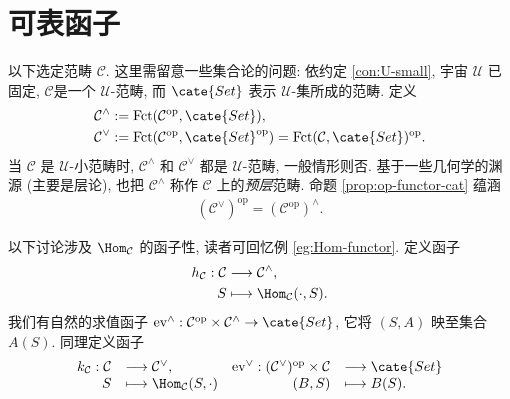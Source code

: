 \section{可表函子}\label{sec:representable-functors}
以下选定范畴 $\mathcal{C}$. 这里需留意一些集合论的问题: 依约定 \ref{con:U-small}, 宇宙 $\mathcal{U}$ 已固定, $\mathcal{C} $是一个 $\mathcal{U}$-范畴, 而 $\cate{Set}$ 表示 $\mathcal{U}$-集所成的范畴. 定义
\begin{align*}
	\mathcal{C}^\wedge & := \text{Fct}(\mathcal{C}^\text{op}, \cate{Set}), \\
	\mathcal{C}^\vee & := \text{Fct}(\mathcal{C}^\text{op}, \cate{Set}^\text{op}) = \text{Fct}(\mathcal{C}, \cate{Set})^\text{op}.
\end{align*}
当 $\mathcal{C}$ 是 $\mathcal{U}$-小范畴时, $\mathcal{C}^\wedge$ 和 $\mathcal{C}^\vee$ 都是 $\mathcal{U}$-范畴, 一般情形则否. 基于一些几何学的渊源 (主要是层论), 也把 $\mathcal{C}^\wedge$ 称作 $\mathcal{C}$ 上的\emph{预层}范畴. 命题 \ref{prop:op-functor-cat} 蕴涵
\begin{gather}\label{eqn:Yoneda-cat-duality}
	(\mathcal{C}^\vee)^\text{op} = (\mathcal{C}^\text{op})^\wedge .
\end{gather}

以下讨论涉及 $\Hom_{\mathcal{C}}$ 的函子性, 读者可回忆例 \ref{eg:Hom-functor}. 定义函子
\begin{align*}
	h_{\mathcal{C}}: \mathcal{C} & \longrightarrow \mathcal{C}^\wedge, \\
	S & \longmapsto \Hom_{\mathcal{C}}(\cdot, S).
\end{align*}
我们有自然的求值函子 $\text{ev}^\wedge: \mathcal{C}^\text{op} \times \mathcal{C}^\wedge \to \cate{Set}$, 它将 $(S, A)$ 映至集合 $A(S)$. 同理定义函子
\[\begin{array}{rlrl}
	k_{\mathcal{C}}: \mathcal{C} & \longrightarrow \mathcal{C}^\vee, & \text{ev}^\vee: (\mathcal{C}^\vee)^\text{op} \times \mathcal{C} & \longrightarrow \cate{Set} \\
	S & \longmapsto \Hom_{\mathcal{C}}(S, \cdot) & (B, S) & \longmapsto B(S).
\end{array}\]

